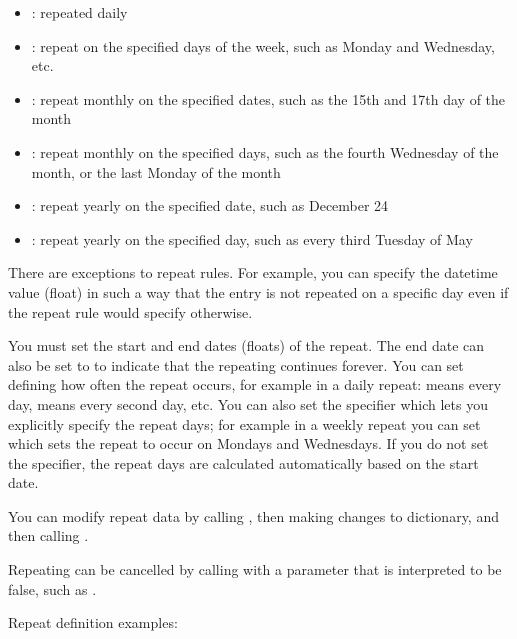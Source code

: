 \begin{itemize}
\item {}: repeated daily
\item {}: repeat on the specified days of the week, such as Monday and Wednesday, etc.
\item {}: repeat monthly on the specified dates, such as the 15th and 17th day of the month
\item {}: repeat monthly on the specified days, such as the fourth Wednesday of the month, or the last Monday of the month
\item {}: repeat yearly on the specified date, such as December 24
\item {}: repeat yearly on the specified day, such as every third Tuesday of May
\end{itemize}

There are exceptions to repeat rules. For example, you can specify the 
datetime value (float) in such a way that the entry is not repeated on a 
specific day even if the repeat rule would specify otherwise.

You must set the start and end dates (floats) of the repeat. The end date 
can also be set to  to indicate that the repeating continues 
forever. You can set  defining how often the repeat occurs, 
for example in a daily repeat:  means every day,  means 
every second day, etc. You can also set the  specifier which 
lets you explicitly specify the repeat days; for example in a weekly repeat 
you can set  which sets the repeat to occur on Mondays 
and Wednesdays. If you do not set the  specifier, the repeat 
days are calculated automatically based on the start date.

You can modify repeat data by calling , then making changes to  
dictionary, and then calling .

Repeating can be cancelled by calling  with a 
parameter that is interpreted to be false, such as 
.

Repeat definition examples:

